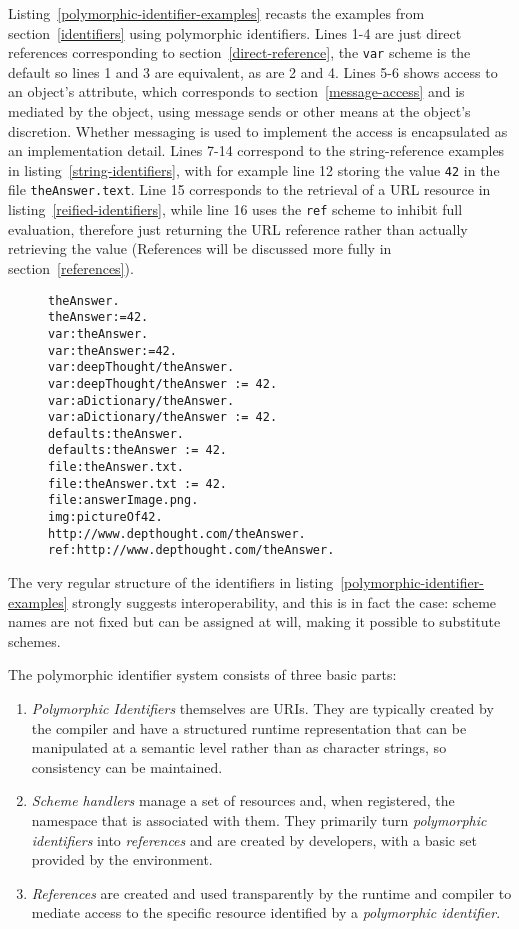 \documentclass[preprint,authoryear]{acm_proc_article-sp}
\begin{document}
Listing~\ref{polymorphic-identifier-examples} recasts the examples from section~\ref{identifiers} using
polymorphic identifiers.  Lines 1-4 are just direct references corresponding to section~\ref{direct-reference},
the {\tt var} scheme is the default so lines 1 and 3 are equivalent, as are 2 and 4.
Lines 5-6 shows access to an object's attribute, which corresponds to section~\ref{message-access} and is
mediated by the object, using message sends or other means at the object's discretion.  Whether messaging
is used to implement the access is encapsulated as an implementation detail.  Lines 7-14 correspond
to the string-reference examples in listing~\ref{string-identifiers}, with for example line 12 storing the
value {\tt 42} in the file {\tt theAnswer.text}.   Line 15 corresponds to the retrieval of a URL resource in listing~\ref{reified-identifiers}, while line 16 uses the {\tt ref} scheme to inhibit full evaluation, therefore just returning the
URL reference rather than actually retrieving the value (References will be discussed more fully in section~\ref{references}).

\begin{figure}[htbp]
\begin{lstlisting}[style=numbers,label=polymorphic-identifier-examples,caption=Some variants of polymorphic identifiers.]
theAnswer.
theAnswer:=42.
var:theAnswer.
var:theAnswer:=42.
var:deepThought/theAnswer.
var:deepThought/theAnswer := 42.
var:aDictionary/theAnswer.
var:aDictionary/theAnswer := 42.
defaults:theAnswer.
defaults:theAnswer := 42.
file:theAnswer.txt.
file:theAnswer.txt := 42.
file:answerImage.png.
img:pictureOf42.
http://www.depthought.com/theAnswer.
ref:http://www.depthought.com/theAnswer.
\end{lstlisting}
\end{figure}

The very regular structure of the identifiers in listing~\ref{polymorphic-identifier-examples} strongly
suggests interoperability, and this is in fact the case:  scheme names are not fixed but can be
assigned at will, making it possible to substitute schemes.

The polymorphic identifier system consists of three basic parts:
\begin{enumerate}
\item {\em Polymorphic Identifiers} themselves are URIs.  They are typically created by the 
	compiler and have a structured runtime representation that can be manipulated
	at a semantic level rather than as character strings, so consistency can be 
	maintained.
\item {\em Scheme handlers} manage a set of resources and, when registered,
	 the namespace that is associated
	with them.  They primarily turn {\em polymorphic identifiers} into {\em references} and
	are created by developers, with a basic set provided by the environment.
\item {\em References} are created and used transparently by the runtime and compiler
	to mediate access to the specific resource identified by a {\em polymorphic identifier}.
	
	
\end{enumerate}
\end{document}
